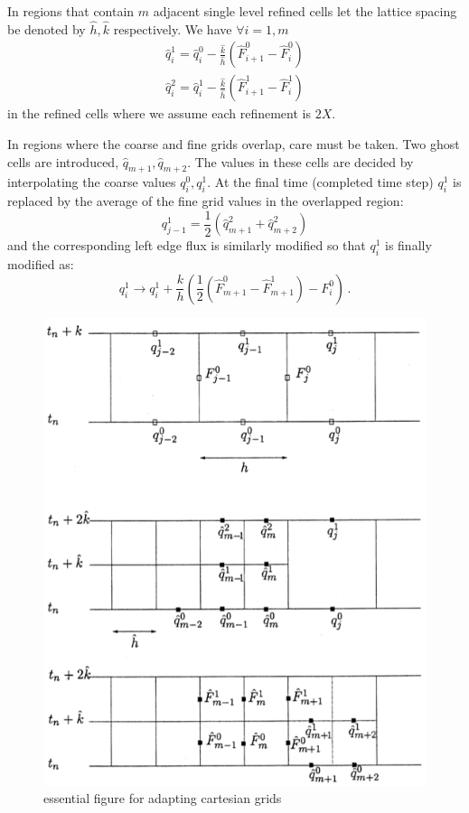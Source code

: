 \documentclass[12pt,leqno]{article}
\begin{document}
In regions that contain $m$ adjacent single level refined cells let the lattice spacing be denoted by $\hat{h},\hat{k}$ respectively.
We have $\forall i=1,m$
\begin{equation}
\begin{array}{c}
\hat{q}_{i}^{1} = \hat{q}_{i}^{0} - \frac{\hat{k}}{\hat{h}} (\hat{F}_{i+1}^{0} - \hat{F}_{i}^{0}) \\
\hat{q}_{i}^{2} = \hat{q}_{i}^{1} - \frac{\hat{k}}{\hat{h}} (\hat{F}_{i+1}^{1} - \hat{F}_{i}^{1}) 
\end{array}
\end{equation}
\noindent in the refined cells where we assume each refinement is $2X$.

In regions where the coarse and fine grids overlap, care must be taken. Two ghost cells are introduced, $\hat{q}_{m+1},\hat{q}_{m+2}$. The values in these 
cells are decided by interpolating the coarse values  $q_{i}^{0}, q_{i}^{1}$. At the final time (completed time step)  $q_{i}^{1}$ is replaced by the average of the 
fine grid values in the overlapped region:
\begin{equation}
q_{j-1}^{1} = \frac{1}{2} (\hat{q}_{m+1}^{2}+\hat{q}_{m+2}^{2})
\end{equation}
\noindent and the corresponding left edge flux is similarly modified so that $q_{i}^{1}$ is finally modified as:
\begin{equation}
q_{i}^{1} \rightarrow q_{i}^{1} + \frac{k}{h} ( \frac{1}{2}(\hat{F}_{m+1}^{0} - \hat{F}_{m+1}^{1}) - F_{i}^{0}) \, .
\end{equation}
 

\begin{figure}[h]
    \centering
    \includegraphics[width=.65\textwidth]{berg-lev-fig21}
    \caption{essential figure for adapting cartesian grids}
    \label{fig21}
\end{figure}
 
\end{document}
